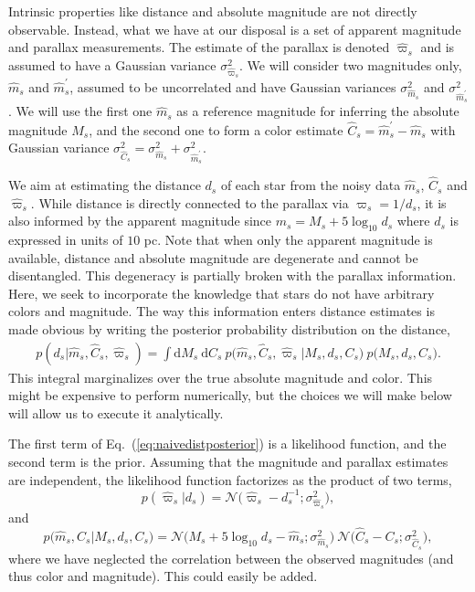 \documentclass[manuscript, letterpaper]{aastex6}
\newcommand{\equref}[1]{{\xspace}Eq.~(\ref{#1})}
\renewcommand{\d}{{\mathrm{d}}}
\newcommand{\equ}[1]{\begin{equation}#1\end{equation}}
\newcommand{\eqn}[1]{\begin{eqnarray}#1\end{eqnarray}}
\begin{document}
Intrinsic properties like distance and absolute magnitude are not directly observable.
Instead, what we have at our disposal is a set of apparent magnitude and parallax measurements.  
The estimate of the parallax is denoted $\hat{\varpi}_s$ and is assumed to have a Gaussian variance $\sigma_{\hat{\varpi}_s}^2$.
We will consider two magnitudes only, $\hat{m}_s$ and $\hat{m}^\prime_s$, assumed to be uncorrelated and have Gaussian variances $\sigma_{\hat{m}_s}^2$ and $\sigma_{\hat{m}^\prime_s}^2$.
We will use the first one $\hat{m}_s$ as a reference magnitude for inferring the absolute magnitude $M_s$, and the second one to form a color estimate $\hat{C}_s =\hat{m}^\prime_s - \hat{m}_s $ with Gaussian variance $\sigma_{\hat{C}_s}^2 = \sigma_{\hat{m}_s}^2 + \sigma_{\hat{m}^\prime_s}^2$.

We aim at estimating the distance $d_s$ of each star from the noisy data $\hat{m}_s$,  $\hat{C}_s$ and $\hat{\varpi}_s$. 
While distance is directly connected to the parallax via $\varpi_s=1/d_s$, it is also informed by the apparent magnitude since $m_s = M_s + 5\log_{10} d_s$ where $d_s$ is expressed in units of $10$ pc.
Note that when only the apparent magnitude is available, distance and absolute magnitude are degenerate and cannot be disentangled. 
This degeneracy is partially broken with the parallax information.
Here, we seek to incorporate the knowledge that stars do not have arbitrary colors and magnitude.
The way this information enters distance estimates is made obvious by writing the posterior probability distribution on the distance,
\eqn{
	p(d_s | \hat{m}_s, \hat{C}_s, \hat{\varpi}_s) = \int \d M_s \ \d C_s \ p\bigl(\hat{m}_s, \hat{C}_s, \hat{\varpi}_s \bigr\rvert M_s, d_s, C_s\bigr) \ p\bigl( M_s, d_s, C_s \bigr) \label{eq:naivedistposterior}.
}
This integral marginalizes over the true absolute magnitude and color.
This might be expensive to perform numerically, but the choices we will make below will allow us to execute it analytically.

The first term of \equref{eq:naivedistposterior} is a likelihood function, and the second term is the prior. 
Assuming that the magnitude and parallax estimates are independent, the likelihood function factorizes as the product of two terms, 
\equ{
	p\left(\hat{\varpi}_s \bigr\rvert d_s\right) = \mathcal{N}\bigl(\hat{\varpi}_s - d_s^{-1};\sigma_{\hat{\varpi}_s}^2 \bigr),\label{eq:parallaxlike}
}
and
\equ{
	p\bigl(\hat{m}_s, \hat{C}_s \bigr\rvert M_s, d_s, C_s\bigr)  =  \mathcal{N}\bigl( M_s + 5\log_{10}d_s  -\hat{m}_s ;\sigma_{\hat{m}_s}^2 \bigr) \  \mathcal{N}\bigl(\hat{C}_s - C_s;\sigma_{\hat{C}_s}^2 \bigr),
}
where we have neglected the correlation between the observed magnitudes (and thus color and magnitude). 
This could easily be added.
\end{document}
